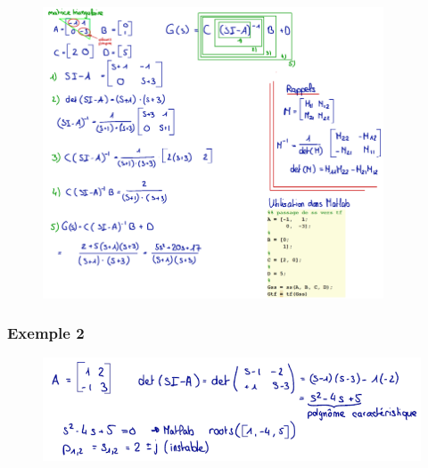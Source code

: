 \documentclass[document.tex]{subfiles}
\begin{document}
\begin{figure}[H]
    \centering
    \includegraphics[width=0.9\textwidth]{Include/Figure/32.png}
\end{figure}

\subsubsection{Exemple 2}

\begin{figure}[H]
    \centering
    \includegraphics[width=\textwidth]{Include/Figure/33.png}
\end{figure}
\end{document}
